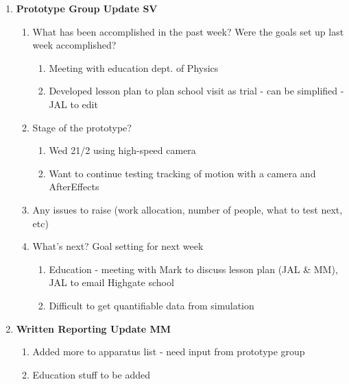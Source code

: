 \begin{enumerate}
\begin{enumerate}
\end{enumerate}

\item  \textbf{Prototype Group Update SV}

\begin{enumerate}
\item What has been accomplished in the past week? Were the goals set up last week accomplished?

\begin{enumerate}
\item  Meeting with education dept. of Physics

\item  Developed lesson plan to plan school visit as trial - can be simplified - JAL to edit
\end{enumerate}

\item  Stage of the prototype?

\begin{enumerate}
\item  Wed 21/2 using high-speed camera

\item  Want to continue testing tracking of motion with a camera and AfterEffects
\end{enumerate}

\item  Any issues to raise (work allocation, number of people, what to test next, etc)

\item  What's next? Goal setting for next week

\begin{enumerate}
\item  Education - meeting with Mark to discuss lesson plan (JAL \& MM), JAL to email Highgate school

\item  Difficult to get quantifiable data from simulation
\end{enumerate}

\end{enumerate}

\item  \textbf{Written Reporting Update MM}

\begin{enumerate}
\item Added more to apparatus list - need input from prototype group

\item  Education stuff to be added


\end{enumerate}
\end{enumerate}
